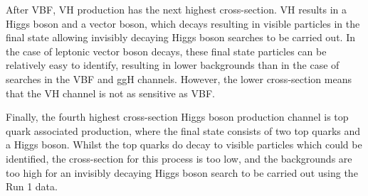 After \ac{VBF}, \ac{VH} production has the next highest cross-section. \ac{VH} results in a Higgs boson and a vector boson, which decays resulting in visible particles in the final state allowing invisibly decaying Higgs boson searches to be carried out. In the case of leptonic vector boson decays, these final state particles can be relatively easy to identify, resulting in lower backgrounds than in the case of searches in the \ac{VBF} and \ac{ggH} channels. However, the lower cross-section means that the \ac{VH} channel is not as sensitive as \ac{VBF}.

Finally, the fourth highest cross-section Higgs boson production channel is top quark associated production, where the final state consists of two top quarks and a Higgs boson. Whilst the top quarks do decay to visible particles which could be identified, the cross-section for this process is too low, and the backgrounds are too high for an invisibly decaying Higgs boson search to be carried out using the Run 1 \LHC data.


